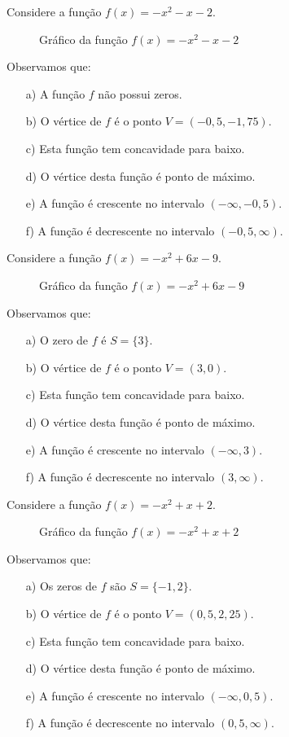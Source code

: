 \begin{exem}
 Considere a função $f(x)= -x^2-x-2$.
   \begin{figure}[H]
  \centering
   \caption{Gráfico da função $f(x)= -x^2-x-2$}
  \end{figure}
 Observamos que:
 \begin{enumerate}
\item [a)] A função $f$ não possui zeros.
\item [b)] O vértice de $f$ é o ponto $V= (-0,5, -1,75)$.
\item [c)] Esta função tem concavidade para baixo.
\item [d)] O vértice desta função é ponto de máximo.
\item [e)] A função é crescente no intervalo $(- \infty, -0,5)$.
\item [f)] A função é decrescente no intervalo $(-0,5, \infty)$.
\end{enumerate}
\end{exem}

\begin{exem}
 Considere a função $f(x)= -x^2+6x-9$.
   \begin{figure}[H]
  \centering
   \caption{Gráfico da função $f(x)= -x^2+6x-9$}
  \end{figure}
 Observamos que:
 \begin{enumerate}
\item [a)] O zero de $f$ é $S= \{3\}$.
\item [b)] O vértice de $f$ é o ponto $V= (3, 0)$.
\item [c)] Esta função tem concavidade para baixo.
\item [d)] O vértice desta função é ponto de máximo.
\item [e)] A função é crescente no intervalo $(-\infty, 3)$.
\item [f)] A função é decrescente no intervalo $(3, \infty)$.
\end{enumerate}
\end{exem}

\begin{exem}
 Considere a função $f(x)= -x^2+x+2$.
   \begin{figure}[H]
  \centering
   \caption{Gráfico da função $f(x)= -x^2+x+2$}
  \end{figure}
 Observamos que:
 \begin{enumerate}
\item [a)] Os zeros de $f$ são $S= \{-1, 2\}$.
\item [b)] O vértice de $f$ é o ponto $V= (0,5, 2,25)$.
\item [c)] Esta função tem concavidade para baixo.
\item [d)] O vértice desta função é ponto de máximo.
\item [e)] A função é crescente no intervalo $(-\infty, 0,5)$.
\item [f)] A função é decrescente no intervalo $(0,5, \infty)$.
\end{enumerate}
\end{exem}

